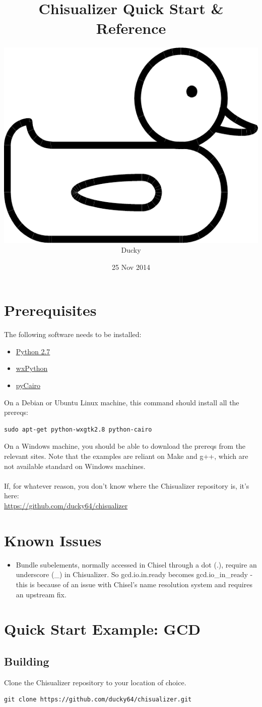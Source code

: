 \documentclass[11pt]{article}
\title{\textbf{Chisualizer Quick Start \& Reference}}
\author{\includegraphics[scale=0.025]{bigduck} Ducky}
\date{25 Nov 2014}
\begin{document}
\maketitle

\section{Prerequisites}
The following software needs to be installed:
\begin{itemize}
  \item \href{https://www.python.org/download/releases/2.7/}{Python 2.7}
  \item \href{http://wxpython.org/download.php}{wxPython}
  \item \href{http://cairographics.org/pycairo/}{pyCairo}
\end{itemize}

On a Debian or Ubuntu Linux machine, this command should install all the prereqs:
\begin{verbatim}
sudo apt-get python-wxgtk2.8 python-cairo
\end{verbatim}

On a Windows machine, you should be able to download the prereqs from the relevant sites. Note that the examples are reliant on Make and g++, which are not available standard on Windows machines. \\
\\
If, for whatever reason, you don't know where the Chisualizer repository is, it's here: \\
\url{https://github.com/ducky64/chisualizer}

\section{Known Issues}
\begin{itemize}
  \item Bundle subelements, normally accessed in Chisel through a dot (.), require an underscore (\_) in Chisualizer. So gcd.io.in.ready becomes gcd.io\_in\_ready - this is because of an issue with Chisel's name resolution system and requires an upstream fix.
\end{itemize}

\section{Quick Start Example: GCD}
\subsection{Building}
Clone the Chisualizer repository to your location of choice.
\begin{verbatim}
git clone https://github.com/ducky64/chisualizer.git
\end{verbatim}
\end{document}
